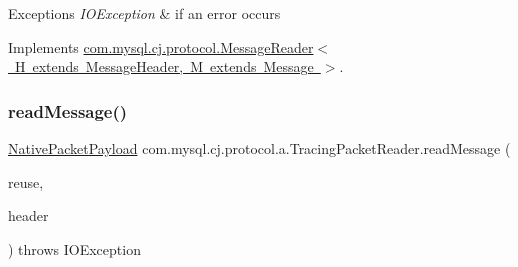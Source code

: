 \begin{DoxyExceptions}{Exceptions}
{\em I\+O\+Exception} & if an error occurs \\
\hline
\end{DoxyExceptions}


Implements \mbox{\hyperlink{interfacecom_1_1mysql_1_1cj_1_1protocol_1_1_message_reader_a09745b0e30f74fa13e2b32f22ce70cbb}{com.\+mysql.\+cj.\+protocol.\+Message\+Reader$<$ H extends Message\+Header, M extends Message $>$}}.

\mbox{\label{classcom_1_1mysql_1_1cj_1_1protocol_1_1a_1_1_tracing_packet_reader_aff5267e4134fe6e81a0122eb5e2d2455}} 
\subsubsection{\texorpdfstring{read\+Message()}{readMessage()}}
{\footnotesize\ttfamily \mbox{\hyperlink{classcom_1_1mysql_1_1cj_1_1protocol_1_1a_1_1_native_packet_payload}{Native\+Packet\+Payload}} com.\+mysql.\+cj.\+protocol.\+a.\+Tracing\+Packet\+Reader.\+read\+Message (\begin{DoxyParamCaption}\item[{Optional$<$ \mbox{\hyperlink{classcom_1_1mysql_1_1cj_1_1protocol_1_1a_1_1_native_packet_payload}{Native\+Packet\+Payload}} $>$}]{reuse,  }\item[{\mbox{\hyperlink{classcom_1_1mysql_1_1cj_1_1protocol_1_1a_1_1_native_packet_header}{Native\+Packet\+Header}}}]{header }\end{DoxyParamCaption}) throws I\+O\+Exception}

\mbox{\label{classcom_1_1mysql_1_1cj_1_1protocol_1_1a_1_1_tracing_packet_reader_a750a22688863ef18d02baaccd7f8475d}} 
